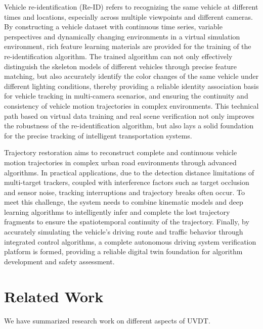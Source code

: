 \documentclass[lettersize,journal]{IEEEtran}
\begin{document}
Vehicle re-identification (Re-ID) refers to recognizing the same vehicle at different times and locations, especially across multiple viewpoints and different cameras. 
By constructing a vehicle dataset with continuous time series, variable perspectives and dynamically changing environments in a virtual simulation environment, rich feature learning materials are provided for the training of the re-identification algorithm.
The trained algorithm can not only effectively distinguish the skeleton models of different vehicles through precise feature matching, but also accurately identify the color changes of the same vehicle under different lighting conditions, thereby providing a reliable identity association basis for vehicle tracking in multi-camera scenarios, and ensuring the continuity and consistency of vehicle motion trajectories in complex environments\cite{Alpher23}.
This technical path based on virtual data training and real scene verification not only improves the robustness of the re-identification algorithm, but also lays a solid foundation for the precise tracking of intelligent transportation systems.

Trajectory restoration aims to reconstruct complete and continuous vehicle motion trajectories in complex urban road environments through advanced algorithms.
In practical applications, due to the detection distance limitations of multi-target trackers, coupled with interference factors such as target occlusion and sensor noise, tracking interruptions and trajectory breaks often occur.
To meet this challenge, the system needs to combine kinematic models and deep learning algorithms to intelligently infer and complete the lost trajectory fragments to ensure the spatiotemporal continuity of the trajectory.
Finally, by accurately simulating the vehicle's driving route and traffic behavior through integrated control algorithms, a complete autonomous driving system verification platform is formed, providing a reliable digital twin foundation for algorithm development and safety assessment\cite{Alpher24c}.

\section{Related Work}

We have summarized research work on different aspects of UVDT.
\end{document}
